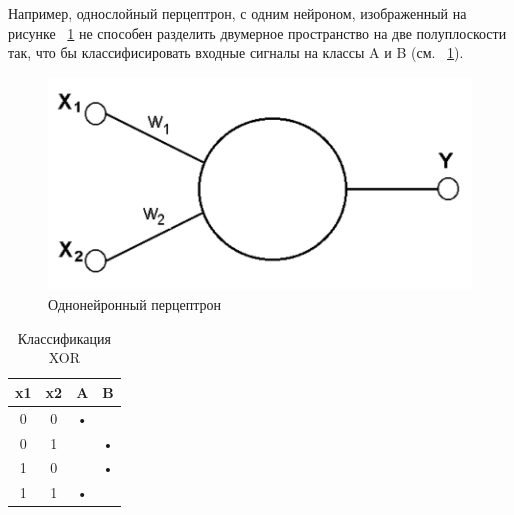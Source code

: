 \documentclass[a4paper,english,russian]{G2-105}
\begin{document}
\par Например, однослойный перцептрон, с одним нейроном, изображенный на рисунке ~\ref{single_neuron} не способен разделить двумерное пространство на две
полуплоскости так, что бы классифисировать входные сигналы на классы A и B (см. ~\ref{a_and_b}).
\begin{figure}
    \includegraphics[width=0.6\linewidth]{single_neuron.png}
    \caption{Однонейронный перцептрон}
	\label{single_neuron}
\end{figure}
\begin{longtable}{|c|c|c|c|}
    \caption{Классификация XOR}\\ \hline
    \label{a_and_b} 
    x1 & x2 & A & B \\ \hline
    0  & 0  & • & \hspace*{1mm}  \\ \hline
    0  & 1  & \hspace*{1mm} &  • \\ \hline
    1  & 0  & \hspace*{1mm} &  • \\ \hline
    1  & 1  & • & \hspace*{1mm} \\ \hline
\end{longtable}
\end{document}
